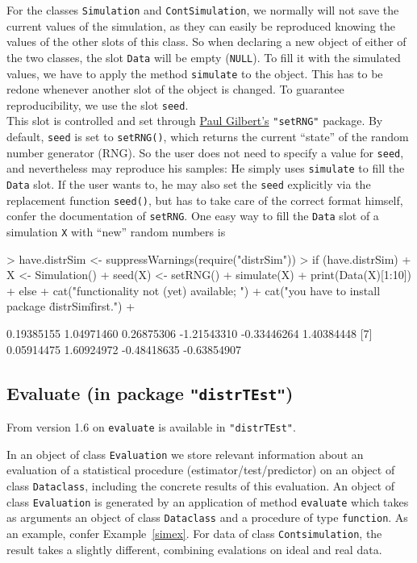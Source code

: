 \documentclass[11pt]{article}
\newcommand{\code}[1]{{\tt #1}}
\newcommand{\pkg}[1]{{\tt "#1"}}
\begin{document}
For the classes \code{Simulation} and \code{ContSimulation}, we normally will
not save the current values of the simulation, as they can easily be reproduced
knowing the values of the other slots of this class.
%
So when declaring a new object of either of the two classes, the slot 
\code{Data} will be empty (\code{NULL}).
To fill it with the simulated values, we have to apply the method 
\code{simulate} to the object. This has to be redone whenever another slot of 
the object is changed.
%
To guarantee reproducibility, we use the slot \code{seed}.\\
%
This slot is controlled and set through 
\href{mailto:pgilbert@bank-banque-canada.ca}{Paul Gilbert's} \pkg{setRNG} 
package.
By default, \code{seed} is set to \code{setRNG()}, which returns the current 
``state'' of the random number generator (RNG). So the user does not need to 
specify a value for \code{seed}, and nevertheless may reproduce his samples: 
He simply uses \code{simulate} to fill the \code{Data} slot.
If the user wants to, he may also set the \code{seed} explicitly via the 
replacement function \code{seed()}, but has to take care of the correct format 
himself, confer the documentation of \code{setRNG}. One easy way to fill 
the \code{Data} slot of a simulation \code{X} with ``new'' random numbers is
\begin{Schunk}
\begin{Sinput}
> have.distrSim <- suppressWarnings(require("distrSim"))
> if (have.distrSim)
+    {X <- Simulation()
+     seed(X) <- setRNG()
+     simulate(X)
+     print(Data(X)[1:10])
+    } else { 
+     cat("\n functionality not (yet) available; ")
+     cat("you have to install package \"distrSim\" first.\n")
+     }
\end{Sinput}
\begin{Soutput}
 [1]  0.19385155  1.04971460  0.26875306 -1.21543310 -0.33446264  1.40384448
 [7]  0.05914475  1.60924972 -0.48418635 -0.63854907
\end{Soutput}
\end{Schunk}
%
\subsection[Evaluate (in package distrTEst)]%
{Evaluate (in package \pkg{distrTEst})}\label{evaluate}
%
From version 1.6 on \code{evaluate} is available in  \pkg{distrTEst}.

In an object of class \code{Evaluation}  we store relevant information
about an evaluation of a statistical procedure (estimator/test/predictor)
on an object of class \code{Dataclass}, including the concrete results of
this evaluation. An object of class \code{Evaluation}  is generated by an 
application of method \code{evaluate} which takes as arguments an object of 
class  \code{Dataclass} and a procedure of type \code{function}. As an example, 
confer Example~\ref{simex}.
For data of class \code{Contsimulation}, the result takes a slightly different,
combining evalations on ideal and real data.
%
\end{document}
